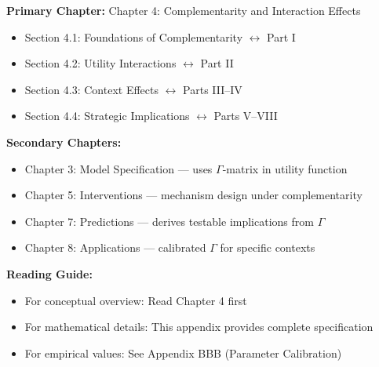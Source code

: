 \begin{tcolorbox}[colback=purple!5!white, colframe=purple!75!black, 
    title=\textbf{Chapter Linkages}]

\textbf{Primary Chapter:} Chapter 4: Complementarity and Interaction Effects
\begin{itemize}[nosep]
    \item Section 4.1: Foundations of Complementarity $\leftrightarrow$ Part I
    \item Section 4.2: Utility Interactions $\leftrightarrow$ Part II
    \item Section 4.3: Context Effects $\leftrightarrow$ Parts III--IV
    \item Section 4.4: Strategic Implications $\leftrightarrow$ Parts V--VIII
\end{itemize}

\textbf{Secondary Chapters:}
\begin{itemize}[nosep]
    \item Chapter 3: Model Specification --- uses $\Gamma$-matrix in utility function
    \item Chapter 5: Interventions --- mechanism design under complementarity
    \item Chapter 7: Predictions --- derives testable implications from $\Gamma$
    \item Chapter 8: Applications --- calibrated $\Gamma$ for specific contexts
\end{itemize}

\textbf{Reading Guide:}
\begin{itemize}[nosep]
    \item For conceptual overview: Read Chapter 4 first
    \item For mathematical details: This appendix provides complete specification
    \item For empirical values: See Appendix BBB (Parameter Calibration)
\end{itemize}

\end{tcolorbox}


